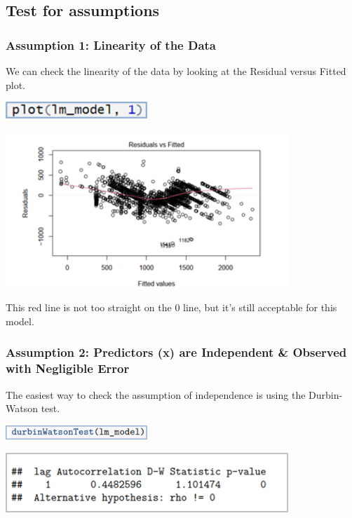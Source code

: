 \subsection{Test for assumptions}
\subsubsection{Assumption 1: Linearity of the Data}
\tab We can check the linearity of the data by looking at the Residual versus Fitted plot. 

\begin{center}
    \includegraphics[width=0.4\textwidth]{test-ass1.1.png}
\end{center}

\begin{center}
    \includegraphics[width=0.8\textwidth]{test-ass1.2.png}
\end{center}
\tab  This red line is not too straight on the 0 line, but it's still acceptable for this model.

\subsubsection{Assumption 2: Predictors (x) are Independent \& Observed with Negligible Error}

\tab The easiest way to check the assumption of independence is using the Durbin-Watson test. 

\begin{center}
    \includegraphics[width=0.4\textwidth]{test-ass2.1.png}
\end{center}

\begin{center}
    \includegraphics[width=0.8\textwidth]{test-ass2.2.png}
\end{center}

